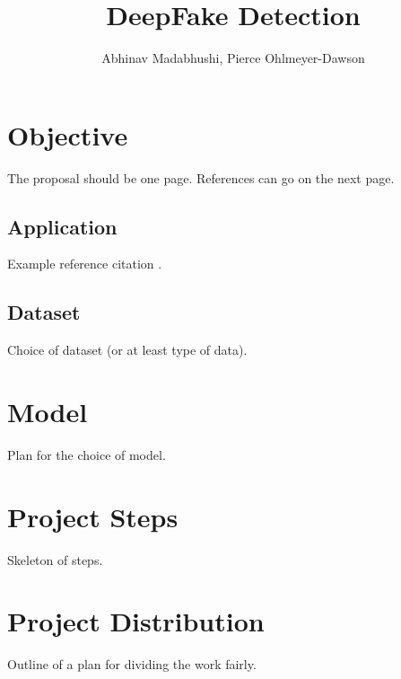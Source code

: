 \documentclass[11pt]{article}
\title{DeepFake Detection}
\author{Abhinav Madabhushi, Pierce Ohlmeyer-Dawson}
\date{}
\begin{document}
\maketitle

\section{Objective}
The proposal should be one page. References can go on the next page.

\subsection{Application}
Example reference citation \cite{bishop2006pattern}. 

\subsection{Dataset}
Choice of dataset (or at least type of data).

\section{Model}
Plan for the choice of model.

\section{Project Steps}
Skeleton of steps.

\section{Project Distribution}

Outline of a plan for dividing the work fairly.




\end{document}
